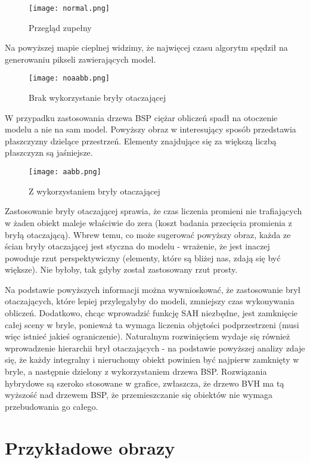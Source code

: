 \begin{figure}[h!]
\centering
  \caption{Przegląd zupełny}
  \texttt{[image: normal.png]}
\end{figure}

Na powyższej mapie cieplnej widzimy, że najwięcej czasu algorytm spędził na generowaniu pikseli zawierających model.

\begin{figure}[h!]
\centering
  \caption{Brak wykorzystanie bryły otaczającej}
  \texttt{[image: noaabb.png]}
\end{figure}

W przypadku zastosowania drzewa BSP ciężar obliczeń spadł na otoczenie modelu a nie na sam model. Powyższy obraz w interesujący sposób przedstawia płaszczyzny dzielące przestrzeń. Elementy znajdujące się za większą liczbą płaszczyzn są jaśniejsze. 

\begin{figure}[h!]
\centering
  \caption{Z wykorzystaniem bryły otaczającej}
  \texttt{[image: aabb.png]}
\end{figure}

Zastosowanie bryły otaczającej sprawia, że czas liczenia promieni nie trafiających w żaden obiekt maleje właściwie do zera (koszt badania przecięcia promienia z bryłą otaczającą). Wbrew temu, co może sugerować powyższy obraz, każda ze ścian bryły otaczającej jest styczna do modelu - wrażenie, że jest inaczej powoduje rzut perspektywiczny (elementy, które są bliżej nas, zdają się być większe). Nie byłoby, tak gdyby został zastosowany rzut prosty.

Na podstawie powyższych informacji można wywnioskować, że zastosowanie brył otaczających, które lepiej przylegałyby do modeli, zmniejszy czas wykonywania obliczeń. Dodatkowo, chcąc wprowadzić funkcję SAH niezbędne, jest zamknięcie całej sceny w bryle, ponieważ ta wymaga liczenia objętości podprzestrzeni (musi więc istnieć jakieś ograniczenie). Naturalnym rozwinięciem wydaje się również wprowadzenie hierarchii brył otaczających - na podstawie powyższej analizy zdaje się, że każdy integralny i nieruchomy obiekt powinien być najpierw zamknięty w bryle, a następnie dzielony z wykorzystaniem drzewa BSP. Rozwiązania hybrydowe są szeroko stosowane w grafice, zwłaszcza, że drzewo BVH ma tą wyższość nad drzewem BSP, że przemieszczanie się obiektów nie wymaga przebudowania go całego.

\section{Przykładowe obrazy}



